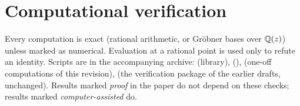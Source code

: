 \appendix

\section{Computational verification}\label{app:verification}

Every computation is exact (rational arithmetic, or Gr\"obner bases over $\mathbb{Q}(z)$) unless marked as numerical. Evaluation at a rational point is used only to refute an identity. Scripts are in the accompanying archive:  (library),  (),  (one-off computations of this revision),  (the verification package of the earlier drafts, unchanged). Results marked \emph{proof} in the paper do not depend on these checks; results marked \emph{computer-assisted} do.

